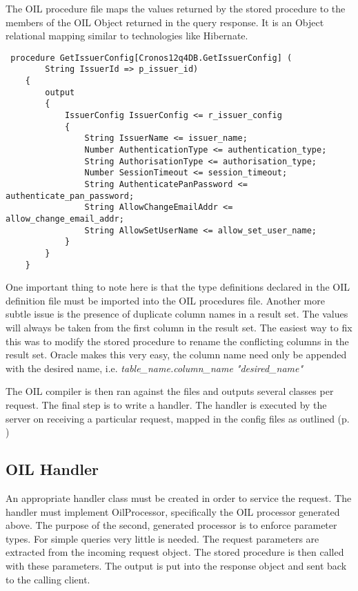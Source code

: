 \documentclass[a4paper, 11pt, titlepage]{article}
\begin{document}
The OIL procedure file maps the values returned by the stored procedure to the members of the OIL Object returned in the query response. It is an Object relational mapping similar to technologies like Hibernate. 
\begin{verbatim} 
 procedure GetIssuerConfig[Cronos12q4DB.GetIssuerConfig] ( 
        String IssuerId => p_issuer_id) 
    { 
        output 
        { 
            IssuerConfig IssuerConfig <= r_issuer_config 
            { 
                String IssuerName <= issuer_name; 
                Number AuthenticationType <= authentication_type; 
                String AuthorisationType <= authorisation_type; 
                Number SessionTimeout <= session_timeout; 
                String AuthenticatePanPassword <= authenticate_pan_password; 
                String AllowChangeEmailAddr <= allow_change_email_addr; 
                String AllowSetUserName <= allow_set_user_name; 
            } 
        } 
    }  
\end{verbatim} 
One important thing to note here is that the type definitions declared in the OIL definition file must be imported into the OIL procedures file. Another more subtle issue is the presence of duplicate column names in a result set. The values will always be taken from the first column in the result set. The easiest way to fix this was to modify the stored procedure to rename the conflicting columns in the result set. Oracle makes this very easy, the column name need only be appended with the desired name, i.e. \textit{ table\_name.column\_name "desired\_name" } 
 
The OIL compiler is then ran against the files and outputs several classes per request.  The final step is to write a handler. The handler is executed by the server on receiving a particular request, mapped in the config files as outlined (p. \pageref{handlerset})
 
\subsection{OIL Handler} 
An appropriate handler class must be created in order to service the request. The handler must implement OilProcessor, specifically the OIL processor generated above. The purpose of the second, generated processor is to enforce parameter types. For simple queries very little is needed. The request parameters are extracted from the incoming request object. The stored procedure is then called with these parameters. The output is put into the response object and sent back to the calling client. 
 
\end{document}
